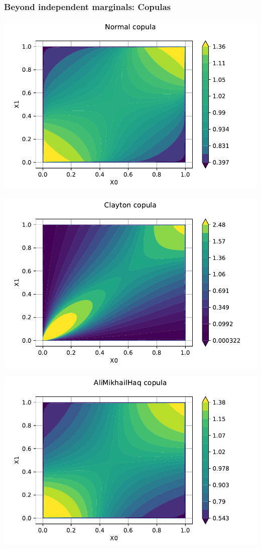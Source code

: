 \documentclass{beamer}
\begin{document}
\begin{frame}[containsverbatim]
\frametitle{Beyond independent marginals: Copulas}

\begin{minipage}[t]{0.5\textwidth}
    \includegraphics[width=.85\textwidth]{figures/Copula1.pdf}

\end{minipage}%
\begin{minipage}[t]{0.5\textwidth}
    \includegraphics[width=.85\textwidth]{figures/Copula2.pdf}

\end{minipage}
\begin{minipage}[t]{0.5\textwidth}
    \includegraphics[width=.85\textwidth]{figures/Copula3.pdf}


\end{minipage}
\end{frame}
\end{document}

